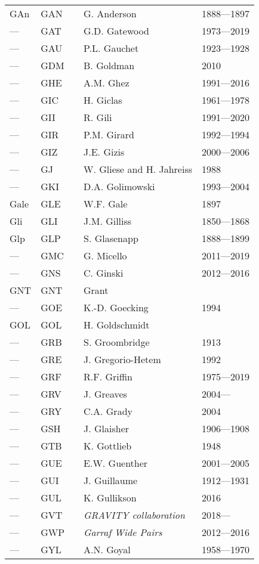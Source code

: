 \begin{longtable}{l|l|c|p{59mm}|l}
GAn & GAN &   & G. Anderson & 1888---1897 \\
--- & GAT &   & G.D. Gatewood & 1973---2019 \\
--- & GAU &   & P.L. Gauchet & 1923---1928 \\
--- & GDM &   & B. Goldman & 2010 \\
--- & GHE &   & A.M. Ghez & 1991---2016 \\
--- & GIC &   & H. Giclas & 1961---1978 \\
--- & GII &   & R. Gili & 1991---2020 \\
--- & GIR &   & P.M. Girard & 1992---1994 \\
--- & GIZ &   & J.E. Gizis & 2000---2006 \\
--- & GJ  &   & W. Gliese and H. Jahreiss & 1988 \\
--- & GKI &   & D.A. Golimowski & 1993---2004 \\
Gale & GLE &   & W.F. Gale & 1897 \\
Gli & GLI &   & J.M. Gilliss & 1850---1868 \\
Glp & GLP &   & S. Glasenapp & 1888---1899 \\
--- & GMC &   & G. Micello & 2011---2019 \\
--- & GNS &   & C. Ginski & 2012---2016 \\
GNT & GNT &   & Grant & \\
--- & GOE &   & K.-D. Goecking & 1994 \\
GOL & GOL &   & H. Goldschmidt & \\
--- & GRB &   & S. Groombridge & 1913 \\
--- & GRE &   & J. Gregorio-Hetem & 1992 \\
--- & GRF &   & R.F. Griffin & 1975---2019 \\
--- & GRV &   & J. Greaves & 2004--- \\
--- & GRY &   & C.A. Grady & 2004 \\
--- & GSH &   & J. Glaisher & 1906---1908 \\
--- & GTB &   & K. Gottlieb & 1948 \\
--- & GUE &   & E.W. Guenther & 2001---2005 \\
--- & GUI &   & J. Guillaume & 1912---1931 \\
--- & GUL &   & K. Gullikson & 2016 \\
--- & GVT &   & \emph{GRAVITY collaboration} & 2018--- \\
--- & GWP &   & \emph{Garraf Wide Pairs} & 2012---2016 \\
--- & GYL &   & A.N. Goyal & 1958---1970 \\

\end{longtable}
